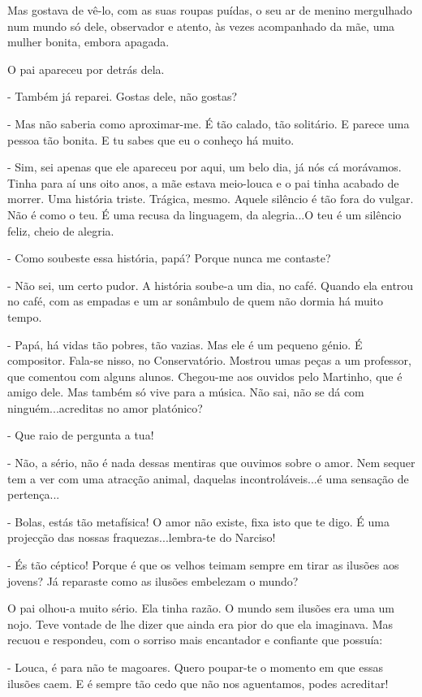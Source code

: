 Mas gostava de vê-lo, com as suas roupas puídas, o seu ar de menino
mergulhado num mundo só dele, observador e atento, às vezes acompanhado
da mãe, uma mulher bonita, embora apagada.

O pai apareceu por detrás dela.

- Também já reparei. Gostas dele, não gostas?

- Mas não saberia como aproximar-me. É tão calado, tão solitário. E
parece uma pessoa tão bonita. E tu sabes que eu o conheço há muito.

- Sim, sei apenas que ele apareceu por aqui, um belo dia, já nós cá
morávamos. Tinha para aí uns oito anos, a mãe estava meio-louca e o pai
tinha acabado de morrer. Uma história triste. Trágica, mesmo. Aquele
silêncio é tão fora do vulgar. Não é como o teu. É uma recusa da
linguagem, da alegria...O teu é um silêncio feliz, cheio de alegria.

- Como soubeste essa história, papá? Porque nunca me contaste?

- Não sei, um certo pudor. A história soube-a um dia, no café. Quando
ela entrou no café, com as empadas e um ar sonâmbulo de quem não dormia
há muito tempo.

- Papá, há vidas tão pobres, tão vazias. Mas ele é um pequeno génio. É
compositor. Fala-se nisso, no Conservatório. Mostrou umas peças a um
professor, que comentou com alguns alunos. Chegou-me aos ouvidos pelo
Martinho, que é amigo dele. Mas também só vive para a música. Não sai,
não se dá com ninguém...acreditas no amor platónico?

- Que raio de pergunta a tua!

- Não, a sério, não é nada dessas mentiras que ouvimos sobre o amor. Nem
sequer tem a ver com uma atracção animal, daquelas incontroláveis...é
uma sensação de pertença...

- Bolas, estás tão metafísica! O amor não existe, fixa isto que te digo.
É uma projecção das nossas fraquezas...lembra-te do Narciso!

- És tão céptico! Porque é que os velhos teimam sempre em tirar as
ilusões aos jovens? Já reparaste como as ilusões embelezam o mundo?

O pai olhou-a muito sério. Ela tinha razão. O mundo sem ilusões era uma
um nojo. Teve vontade de lhe dizer que ainda era pior do que ela
imaginava. Mas recuou e respondeu, com o sorriso mais encantador e
confiante que possuía:

- Louca, é para não te magoares. Quero poupar-te o momento em que essas
ilusões caem. E é sempre tão cedo que não nos aguentamos, podes
acreditar!

